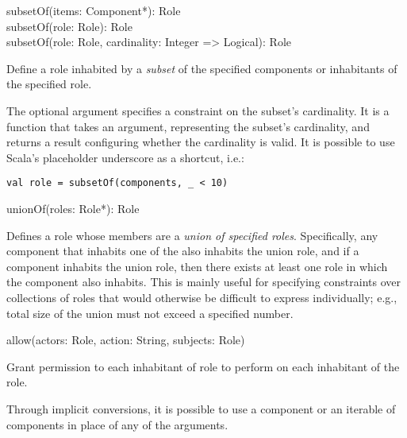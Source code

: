 \begin{dslsig}
subsetOf(items: Component*): Role \\
subsetOf(role: Role): Role \\
subsetOf(role: Role, cardinality: Integer => Logical): Role
\end{dslsig}
\begin{dsldesc}
    Define a role inhabited by a \textit{subset} of the specified components or
    inhabitants of the specified role.
    
    The optional argument  specifies a constraint on the subset's
    cardinality. It is a function that takes an  argument, representing the
    subset's cardinality, and returns a  result configuring whether the
    cardinality is valid. It is possible to use Scala's placeholder underscore as a
    shortcut, i.e.:

\begin{lstlisting}[style=snippet]
val role = subsetOf(components, _ < 10)
\end{lstlisting}
\end{dsldesc}

\begin{dslsig}
unionOf(roles: Role*): Role
\end{dslsig}
\begin{dsldesc}
    Defines a role whose members are a \textit{union of specified roles}. Specifically,
    any component that inhabits one of the  also inhabits the union role, and
    if a component inhabits the union role, then there exists at least one role in
     which the component also inhabits. This is mainly useful for specifying
    constraints over collections of roles that would otherwise be difficult to express
    individually; e.g., total size of the union must not exceed a specified number.
\end{dsldesc}

\begin{dslsig}
allow(actors: Role, action: String, subjects: Role)
\end{dslsig}
\begin{dsldesc}
    Grant permission to each inhabitant of  role to perform  on
    each inhabitant of the  role.

    Through implicit conversions, it is possible to use a component or an iterable of
    components in place of any of the  arguments.
\end{dsldesc}

